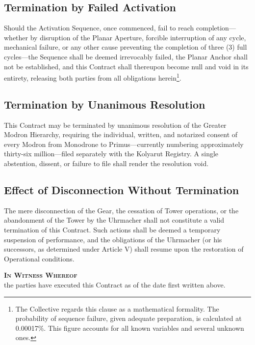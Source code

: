 \documentclass[12pt]{article}
\begin{document}
\subsection{Termination by Failed Activation}
Should the Activation Sequence, once commenced, fail to reach
completion---whether by disruption of the Planar Aperture, forcible
interruption of any cycle, mechanical failure, or any other cause
preventing the completion of three (3)
full cycles---the Sequence shall be deemed irrevocably failed,
the Planar Anchor shall not be established, and this Contract shall
thereupon become null and void in its entirety, releasing
both parties from all obligations herein\footnote{The Collective
regards this clause as a mathematical formality. The probability of
sequence failure, given adequate preparation, is calculated at
0.00017\%. This figure accounts for all known variables and
several unknown ones.}.

\subsection{Termination by Unanimous Resolution}
This Contract may be terminated by unanimous resolution of the
Greater Modron Hierarchy, requiring the individual, written, and
notarized consent of every Modron from Monodrone to Primus---currently
numbering approximately thirty-six million---filed separately with the
Kolyarut Registry. A single abstention, dissent, or failure to file
shall render the resolution void.

\subsection{Effect of Disconnection Without Termination}
The mere disconnection of the Gear, the cessation of Tower operations,
or the abandonment of the Tower by the Uhrmacher shall not
constitute a valid termination of this Contract. Such actions shall be
deemed a temporary suspension of performance, and the obligations of
the Uhrmacher (or his successors, as determined under Article V)
shall resume upon the restoration of Operational conditions.


\newpage

\begin{center}
{\large\bfseries\scshape In Witness Whereof}\\[6pt]
{\normalsize the parties have executed this Contract as of the date
first written above.}
\end{center}
\end{document}
